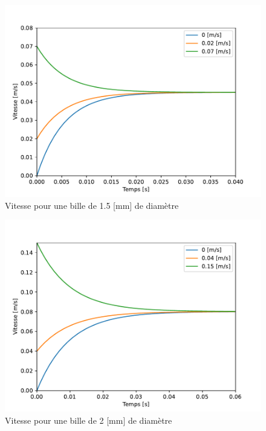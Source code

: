 \begin{minipage}{0.475\textwidth}
    \begin{figure}[H]
        \centering
        \includegraphics[scale=0.55]{graph/ray2_it}
        \caption{Vitesse pour une bille de 1.5 [mm] de diamètre}
        \label{fig:ray2_it}
    \end{figure}
\end{minipage}
\begin{figure}[H]
    \centering
    \includegraphics[scale=0.55]{graph/ray3_it}
    \caption{Vitesse pour une bille de 2 [mm] de diamètre}
    \label{fig:ray3_it}
\end{figure}

